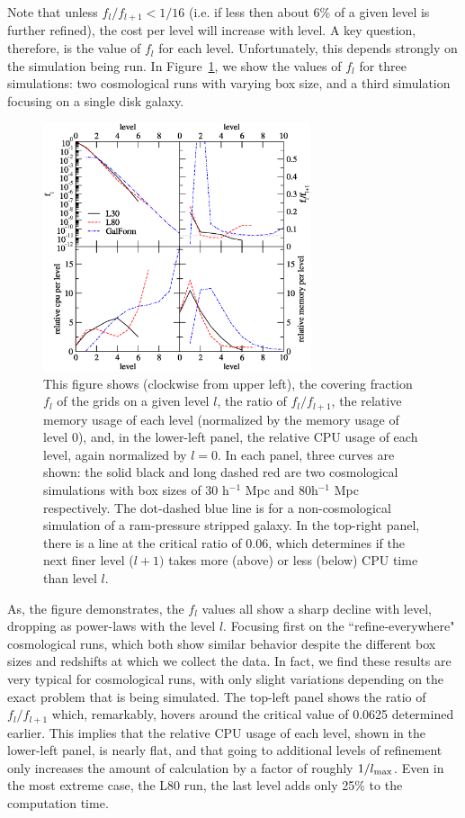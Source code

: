 Note that unless $f_l/f_{l+1} < 1/16$ (i.e. if less then about 6\% of
a given level is further refined), the cost per level will increase
with level.  A key question, therefore, is the value of $f_l$ for each
level.  Unfortunately, this depends strongly on the simulation being
run.  In Figure~\ref{fig:scaling}, we show the values of $f_l$ for
three simulations: two cosmological runs with varying box size, and a
third simulation focusing on a single disk galaxy.

\begin{figure}
\centerline{\includegraphics[width=0.7\textwidth]{figures/scaling_plot2}}
\caption{This figure shows (clockwise from upper left), the covering
fraction $f_l$ of the grids on a given level $l$, the ratio of
$f_{l}/f_{l+1}$, the relative memory usage of each level (normalized
by the memory usage of level 0), and, in the lower-left panel, the
relative CPU usage of each level, again normalized by $l=0$.  In each
panel, three curves are shown: the solid black and long dashed red are
two cosmological simulations with box sizes of 30 h$^{-1}$ Mpc and
80h$^{-1}$ Mpc respectively.  The dot-dashed blue line is for a
non-cosmological simulation of a ram-pressure stripped galaxy.  In the
top-right panel, there is a line at the critical ratio of 0.06, which
determines if the next finer level ($l+1)$ takes more (above) or less
(below) CPU time than level $l$.}
\label{fig:scaling}
\end{figure}

As, the figure demonstrates, the $f_l$ values all show a sharp decline
with level, dropping as power-laws with the level $l$.  Focusing first
on the ``refine-everywhere" cosmological runs, which both show similar
behavior despite the different box sizes and redshifts at which we
collect the data.  In fact, we find these results are very typical for
cosmological runs, with only slight variations depending on the exact
problem that is being simulated.  The top-left panel
shows the ratio of $f_{l}/f_{l+1}$ which, remarkably, hovers around
the critical value of 0.0625 determined earlier.  This implies that
the relative CPU usage of each level, shown in the lower-left panel,
is nearly flat, and that going to additional levels of refinement only
increases the amount of calculation by a factor of roughly $1/l_{\rm
max}$.  Even in the most extreme case, the L80 run, the last level
adds only 25\% to the computation time.

